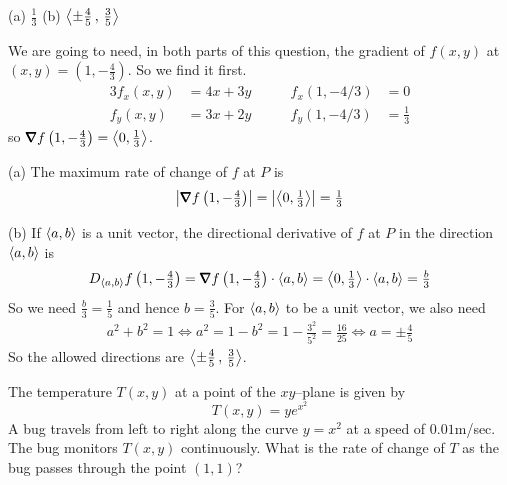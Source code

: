 %

\begin{answer}
(a) $\frac{1}{3}$\qquad
(b) $\left< \pm\frac{4}{5}\,,\,\frac{3}{5}\right>$
\end{answer}

\begin{solution}
We are going to need, in both parts of this question,
the gradient of $f(x,y)$ at $(x,y)=\left(1, -\frac{4}{3}\right)$.
So we find it first.
\begin{alignat*}{3}
f_x(x,y)&=4x+3y\qquad &
f_x(1,-4/3)&=0
\\
f_y(x,y)&=3x+2y\qquad &
f_y(1,-4/3)&=\frac{1}{3}
\end{alignat*}
so $\vnabla f\left(1, -\frac{4}{3}\right) =\llt 0,\frac{1}{3}\rgt$.

(a) The maximum rate of change of $f$ at $P$ is
\begin{align*}
\left|\vnabla f\left(1, -\tfrac{4}{3}\right)\right| 
=\left|\llt 0,\tfrac{1}{3}\rgt\right|
=\tfrac{1}{3}
\end{align*}

(b) If $\left< a,b\right>$ is a unit vector, the directional derivative of $f$
at $P$ in the direction $\left< a,b\right>$ is
\begin{align*}
D_{\llt a,b\rgt}f\left(1, -\tfrac{4}{3}\right)
=\vnabla f\left(1, -\tfrac{4}{3}\right)\cdot \llt a,b\rgt
=\llt 0,\tfrac{1}{3}\rgt\cdot \llt a,b\rgt
=\tfrac{b}{3}
\end{align*}
So we need $\frac{b}{3}=\frac{1}{5}$ and hence $b=\frac{3}{5}$.
For $\left< a,b\right>$ to be a unit vector, we also need
\begin{align*}
a^2+b^2=1
\iff
a^2=1-b^2=1-\frac{3^2}{5^2}=\frac{16}{25}
\iff
a=\pm\frac{4}{5}
\end{align*}
So the allowed directions are $\left< \pm\frac{4}{5}\,,\,\frac{3}{5}\right>$.
\end{solution}

\begin{question}[M200 2010A] %
The temperature $T(x, y)$ at a point of the $xy$--plane is given by
\begin{equation*}
T(x, y) = ye^{x^2} 
\end{equation*}
A bug travels from left to right along the curve $y = x^2$ at a speed of $0.01$m/sec. The bug
monitors $T(x, y)$ continuously. What is the rate of change of $T$ as the bug passes through
the point $(1, 1)$?
\end{question}

